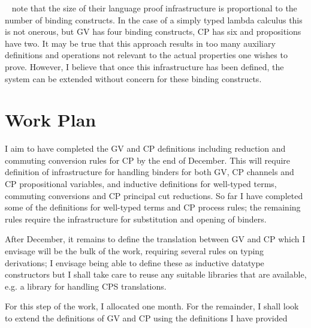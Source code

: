 \documentclass{mprop}
\newcommand{\1}{\textbf{1}\xspace}
\begin{document}
\citeauthor{Aydemir:2008:EFM}~\cite{Aydemir:2008:EFM} note that the size of their language proof infrastructure is proportional to the number of binding constructs. In the case of a simply typed lambda calculus this is not onerous, but GV has four binding constructs, CP has six and propositions have two. It may be true that this approach results in too many auxiliary definitions and operations not relevant to the actual properties one wishes to prove. However, I believe that once this infrastructure has been defined, the system can be extended without concern for these binding constructs.

\section{Work Plan}

I aim to have completed the GV and CP definitions including reduction and commuting conversion rules for CP by the end of December. This will require definition of infrastructure for handling binders for both GV, CP channels and CP propositional variables, and inductive definitions for well-typed terms, commuting conversions and CP principal cut reductions. So far I have completed some of the definitions for well-typed terms and CP process rules; the remaining rules require the infrastructure for substitution and opening of binders.

After December, it remains to define the translation between GV and CP which I envisage will be the bulk of the work, requiring several rules on typing derivations; I envisage being able to define these as inductive datatype constructors but I shall take care to reuse any suitable libraries that are available, e.g. a library for handling CPS translations.

 For this step of the work, I allocated one month. For the remainder, I shall look to extend the definitions of GV and CP using the definitions I have provided


\printbibliography
\end{document}
